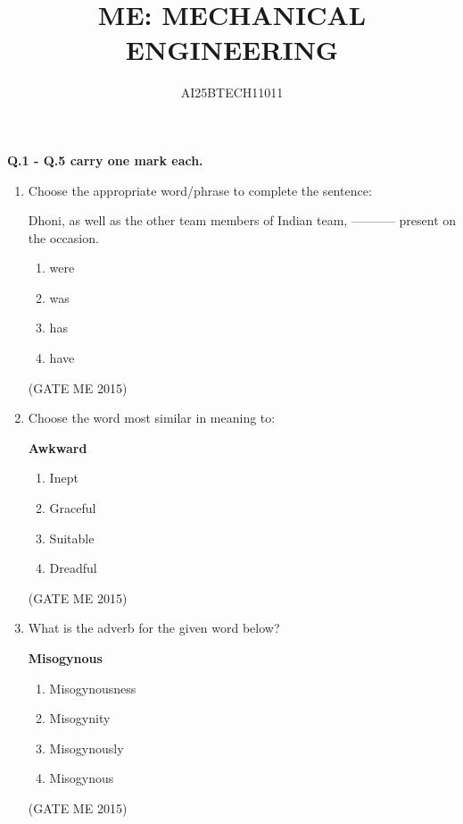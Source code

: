 \documentclass[journal]{IEEEtran}
\begin{document}
\title{
ME: MECHANICAL ENGINEERING}
\author{AI25BTECH11011}
\maketitle
\renewcommand{\thefigure}{\theenumi}
\renewcommand{\thetable}{\theenumi}

\textbf{Q.1 - Q.5 carry one mark each.}

\begin{enumerate}

\item Choose the appropriate word/phrase to complete the sentence:

Dhoni, as well as the other team members of Indian team, ----------- present on the occasion.
\begin{multicols}{4}
\begin{enumerate}
\item were  
\item was  
\item has  
\item have  
\end{enumerate}
\end{multicols}
\hfill  (GATE ME 2015)

\item Choose the word most similar in meaning to:

\textbf{Awkward}
\begin{multicols}{4}
\begin{enumerate}
\item Inept  
\item Graceful  
\item Suitable  
\item Dreadful  
\end{enumerate}
\end{multicols}
\hfill  (GATE ME 2015)

\item What is the adverb for the given word below?

\textbf{Misogynous}
\begin{multicols}{4}
\begin{enumerate}
\item Misogynousness  
\item Misogynity  
\item Misogynously  
\item Misogynous  
\end{enumerate}
\end{multicols}
\hfill  (GATE ME 2015)



\end{enumerate}
\end{document}
